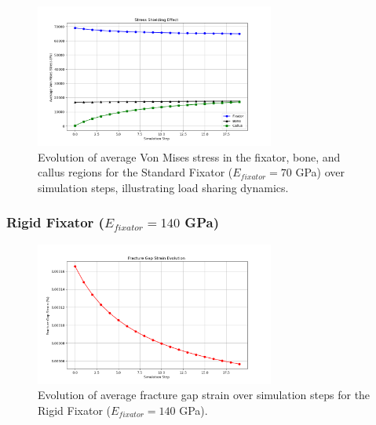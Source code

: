 \documentclass{article}
\begin{document}
\begin{figure}[htbp]
  \centering
  \includegraphics[width=0.7\textwidth]{../output_advanced/Standard/stress_shielding.png}
  \caption{Evolution of average Von Mises stress in the fixator, bone, and callus regions for the Standard Fixator ($E_{fixator} = 70$ GPa) over simulation steps, illustrating load sharing dynamics.}
  \label{fig:standard_stress_shielding}
\end{figure}

\clearpage %

\subsubsection{Rigid Fixator (\texorpdfstring{$E_{fixator} = 140$}{E\_fixator = 140} GPa)}

\begin{figure}[htbp]
  \centering
  \includegraphics[width=0.7\textwidth]{../output_advanced/Rigid/gap_strain.png}
  \caption{Evolution of average fracture gap strain over simulation steps for the Rigid Fixator ($E_{fixator} = 140$ GPa).}
  \label{fig:rigid_gap_strain}
\end{figure}
\end{document}
